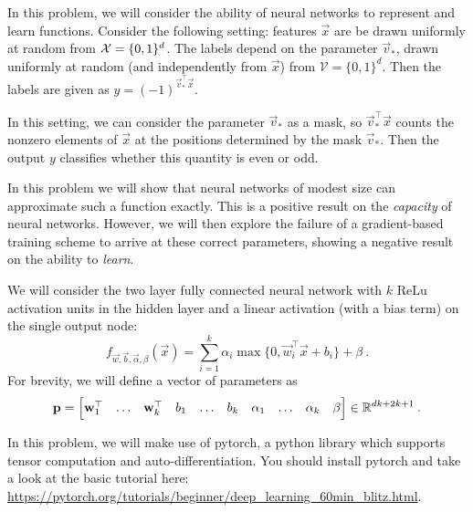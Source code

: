 \documentclass[preview]{standalone}
\begin{document}
\newcommand{\calV}{\mathcal{V}}
\newcommand{\1}{\mathbf{1}}

In this problem, we will consider the ability of neural networks to represent and learn functions. 
Consider the following setting: features $\vec x$ are be drawn uniformly at random from $\mathcal{X} = \{0,1\}^d$. The labels depend on the parameter $\vec v_*$, drawn uniformly at random (and independently from $\vec x$) from $\calV = \{0,1\}^d$. 
Then the labels are given as $y = (-1)^{\vec v_*^\top \vec x}$.

In this setting, we can consider the parameter $\vec v_*$ as a mask, so $\vec v_*^\top \vec x$ counts the nonzero elements of $\vec x$ at the positions determined by the mask $\vec v_*$. Then the output $y$ classifies whether this quantity is even or odd.

In this problem we will show that neural networks of modest size can approximate such a function exactly. This is a positive result on the \emph{capacity} of neural networks. However, we will then explore the failure of a gradient-based training scheme to arrive at these correct parameters, showing a negative result on the ability to \emph{learn}.

We will consider the two layer fully connected neural network with $k$ ReLu activation units in the hidden layer and a linear activation (with a bias term) on the single output node:
\[f_{\vec w, \vec b, \vec\alpha,\beta}(\vec x) = \sum_{i=1}^k \alpha_{i} \max\{0,\vec w_{i}^\top \vec x + b_{i}\} + \beta\:.\]
For brevity, we will define a vector of parameters as
\[\boldsymbol{\mathbf{p}} = \begin{bmatrix} \boldsymbol{\mathbf{w}}_1^\top & \dots & \boldsymbol{\mathbf{w}}_k^\top & b_1 & \dots & b_k & \alpha_1 & \dots & \alpha_k & \beta \end{bmatrix} \in \mathbb{R}^{dk+2k+1}\:.\]

In this problem, we will make use of pytorch, a python library which supports tensor computation and auto-differentiation. You should install pytorch and take a look at the basic tutorial here: \url{https://pytorch.org/tutorials/beginner/deep_learning_60min_blitz.html}.
\end{document}

